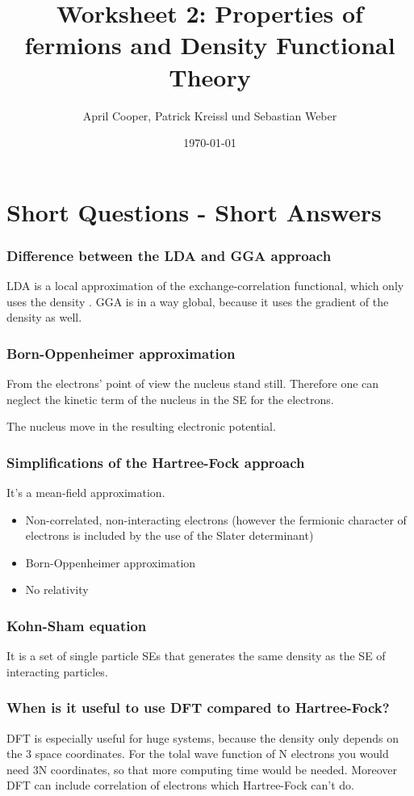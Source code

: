 \documentclass[12pt,a4paper]{scrartcl}
\author{April Cooper, Patrick Kreissl und Sebastian Weber}
\title{Worksheet 2: Properties of fermions and Density Functional Theory}
\date{\today}
\begin{document}
\maketitle
\tableofcontents
\newpage

\section{Short Questions - Short Answers}


\subsubsection*{Difference between the LDA and GGA approach}
LDA is a local approximation of the exchange-correlation functional, which only uses the density . GGA is in a way global, because it uses the gradient of the density as well.

\subsubsection*{Born-Oppenheimer approximation}
From  the electrons' point of view the nucleus stand still. Therefore one can neglect the kinetic term of the nucleus in the SE for the electrons.

The nucleus move in the resulting electronic potential.

\subsubsection*{Simplifications of the Hartree-Fock approach}
It's a mean-field approximation.
\begin{itemize}
\item Non-correlated, non-interacting electrons (however the fermionic character of electrons is included by the use of the Slater determinant)
\item Born-Oppenheimer approximation
\item No relativity
\end{itemize}

\subsubsection*{Kohn-Sham equation}
It is a set of single particle SEs that generates the same density as the SE of interacting particles.

\subsubsection*{When is it useful to use DFT compared to Hartree-Fock?}
DFT is especially useful for huge systems, because the density only depends on the 3 space coordinates. For the tolal wave function of N electrons you would need 3N coordinates, so that more computing time would be needed. Moreover DFT can include correlation of electrons which  Hartree-Fock can't do.
\end{document}
